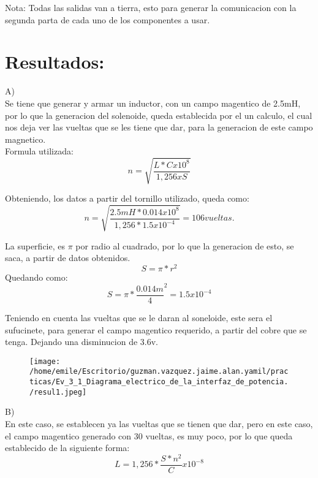 \documentclass[11pt]{article}
\begin{document}
Nota: Todas las salidas van a tierra, esto para generar la comunicacion con la segunda parta de cada uno de los componentes a usar.

\section{Resultados:}

A)\\

Se tiene que generar y armar un inductor, con un campo magentico de 2.5mH, por lo que la generacion del solenoide, queda establecida por el un calculo, el cual nos deja ver las vueltas que se les tiene que dar, para la generacion de este campo magnetico. \\

Formula utilizada:\\
$$ n=\sqrt{\frac{L*Cx10^{8}}{1,256 x S}} $$

Obteniendo, los datos a partir del tornillo utilizado, queda como:\\
$$ n=\sqrt{\frac{2.5mH*0.014x10^{8}}{1,256 * 1.5x10^{-4}}}= 106 vueltas. $$

La superficie, es $ \pi $ por radio al cuadrado, por lo que la generacion de esto, se saca, a partir de datos obtenidos.\\
$$ S=\pi * r^{2} $$
\newpage
Quedando como:\\

$$ S=\pi * \frac{0.014m}{4}^{2}= 1.5x10^{-4} $$

Teniendo en cuenta las vueltas que se le daran al soneloide, este sera el sufucinete, para generar el campo magentico requerido, a partir del cobre que se tenga. Dejando una disminucion de 3.6v.\\

\begin{figure}[htp]
\centering
\texttt{[image: /home/emile/Escritorio/guzman.vazquez.jaime.alan.yamil/practicas/Ev\_3\_1\_Diagrama\_electrico\_de\_la\_interfaz\_de\_potencia./resul1.jpeg]}
\caption{}
\label{}
\end{figure}

B)\\

En este caso, se establecen ya las vueltas que se tienen que dar, pero en este caso, el campo magentico generado con 30 vueltas, es muy poco, por lo que queda establecido de la siguiente forma:\\
$$ L=1,256* \frac{S * n^{2}}{C}x10^{-8} $$
\end{document}
